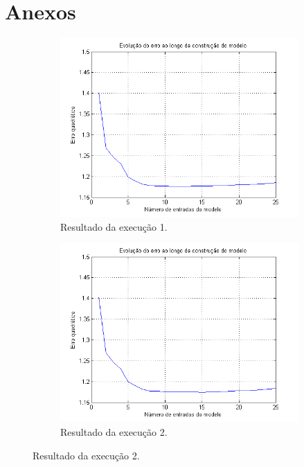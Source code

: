 \newpage

\section{Anexos}

\FloatBarrier
\begin{figure}[H] 
				
			\centering
			
				\begin{subfigure}{.5\textwidth}
				  \centering
				  \includegraphics[width=1\linewidth]{image/forward1}
				  \caption{Resultado da execução 1.}
				  \label{forward1}
				\end{subfigure}%
				\begin{subfigure}{.5\textwidth}
				  \centering
				  \includegraphics[width=1\linewidth]{image/forward2}
				  \caption{Resultado da execução 2.}
				  \label{forward2}
			\end{subfigure}
			

\end{figure}
